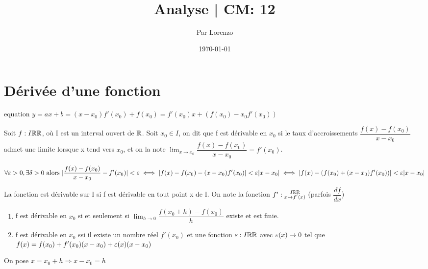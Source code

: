 \documentclass[a4paper, 12pt]{article}
\title{Analyse | CM: 12}
\author{Par Lorenzo}
\date{\today}
\begin{document}
\maketitle

\section{Dérivée d'une fonction}

equation $y = ax + b = (x - x_0)f'(x_0) + f(x_0) = f'(x_0)x + (f(x_0) - x_0f'(x_0))$

\begin{definition}
    Soit $f: I \mathbb{R} \mathbb{R}$, où I est un interval ouvert de $\mathbb{R}$.
    Soit $x_0 \in I$, on dit que f est dérivable en $x_0$ si le taux d'accroissements
    $\dfrac{f(x)-f(x_0)}{x - x_0}$ admet une limite lorsque x tend vers $x_0$,
    et on la note $\lim_{x \to x_0}\dfrac{f(x) - f(x_0)}{x - x_0} = f'(x_0)$.

    $$
    \forall \varepsilon > 0, \exists \delta > 0 \text{ alors } |\dfrac{f(x) - f(x_0)}{x - x_0} - f'(x_0)| < \varepsilon \iff |f(x) - f(x_0) - (x - x_0)f'(x_0)| < \varepsilon |x - x_0| \iff |f(x) - (f(x_0) + (x - x_0)f'(x_0))| < \varepsilon |x - x_0|
    $$
\end{definition}

\begin{definition}
    La fonction est dérivable sur I si f est dérivable en tout point x de I.
    On note la fonction $f': \substack{I \mathbb{R} \mathbb{R} \\ x \mapsto f'(x)}$ (parfois $\dfrac{df}{dx}$)
\end{definition}

\begin{proposition}
    \begin{enumerate}
        \item f est dérivable en $x_0$ si et seulement si $\lim_{h \to 0}\dfrac{f(x_0 + h)- f(x_0)}{h}$ existe et est finie.
        \item f est dérivable en $x_0$ ssi il existe un nombre réel $f'(x_0)$ et une fonction $\varepsilon: I \mathbb{R} \mathbb{R}$ avec
        $\varepsilon(x) \to 0$ %
        tel que $f(x) = f(x_0) + f'(x_0)(x - x_0) + \varepsilon(x)(x-x_0)$
    \end{enumerate}
\end{proposition}

\begin{demonstration}
    On pose $x = x_0 + h \Rightarrow x - x_0 = h$
\end{demonstration}
\end{document}
